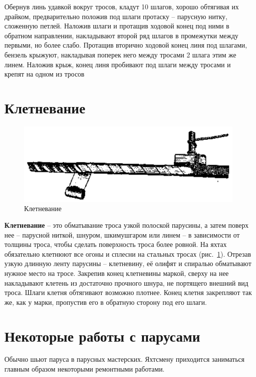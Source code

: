 \documentclass[a4paper, 12pt, twoside, final]{scrbook}
\begin{document}
Обернув линь удавкой вокруг тросов, кладут 10 шлагов, хорошо обтягивая их драйком, предварительно положив под шлаги протаску \--- парусную нитку, сложенную петлей. Наложив шлаги и протащив ходовой конец под ними в обратном направлении, накладывают второй ряд шлагов в промежутки между первыми, но более слабо. Протащив вторично ходовой конец линя под шлагами, бензель крыжуют, накладывая поперек него между тросами 2 шлага этим же линем. Наложив крыж, конец линя пробивают под шлаги между тросами и крепят на одном из тросов 

\section{Клетневание}

\begin{figure}[htbp]
   \centering
   \includegraphics{71_Kletnevanie} %
   \caption{Клетневание}
   \label{fig:71}
\end{figure}

\textbf{Клетневание} \--- это обматывание троса узкой полоской парусины, а затем поверх нее \--- парусной ниткой, шнуром, шкимушгаром или линем \--- в зависимости от толщины троса, чтобы сделать поверхность троса более ровной. На яхтах обязательно клетнюют все огоны и сплесни на стальных тросах (рис.~\ref{fig:71}).
Отрезав узкую длинную ленту парусины \--- клетневину, её олифят и спиралью обматывают нужное место на тросе. Закрепив конец клетневины маркой, сверху на нее накладывают клетень из достаточно прочного шнура, не портящего внешний вид троса. Шлаги клетня обтягивают возможно плотнее. Конец клетня закрепляют так же, как у марки, пропустив его в обратную сторону под его шлаги.

\section{Некоторые работы с парусами}

Обычно шьют паруса в парусных мастерских. Яхтсмену приходится заниматься главным образом некоторыми ремонтными работами.
\end{document}
